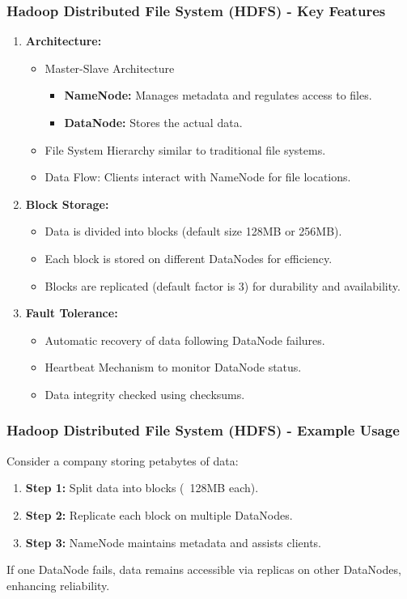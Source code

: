 \documentclass[aspectratio=169]{beamer}
\begin{document}
\begin{frame}[fragile]
    \frametitle{Hadoop Distributed File System (HDFS) - Key Features}
    \begin{enumerate}
        \item \textbf{Architecture:}
        \begin{itemize}
            \item Master-Slave Architecture
            \begin{itemize}
                \item \textbf{NameNode:} Manages metadata and regulates access to files.
                \item \textbf{DataNode:} Stores the actual data.
            \end{itemize}
            \item File System Hierarchy similar to traditional file systems.
            \item Data Flow: Clients interact with NameNode for file locations.
        \end{itemize}
        
        \item \textbf{Block Storage:}
        \begin{itemize}
            \item Data is divided into blocks (default size 128MB or 256MB).
            \item Each block is stored on different DataNodes for efficiency.
            \item Blocks are replicated (default factor is 3) for durability and availability.
        \end{itemize}
        
        \item \textbf{Fault Tolerance:}
        \begin{itemize}
            \item Automatic recovery of data following DataNode failures.
            \item Heartbeat Mechanism to monitor DataNode status.
            \item Data integrity checked using checksums.
        \end{itemize}
    \end{enumerate}
\end{frame}

\begin{frame}[fragile]
    \frametitle{Hadoop Distributed File System (HDFS) - Example Usage}
    Consider a company storing petabytes of data:
    \begin{enumerate}
        \item \textbf{Step 1:} Split data into blocks (~128MB each).
        \item \textbf{Step 2:} Replicate each block on multiple DataNodes.
        \item \textbf{Step 3:} NameNode maintains metadata and assists clients.
    \end{enumerate}
    If one DataNode fails, data remains accessible via replicas on other DataNodes, enhancing reliability.
\end{frame}
\end{document}
